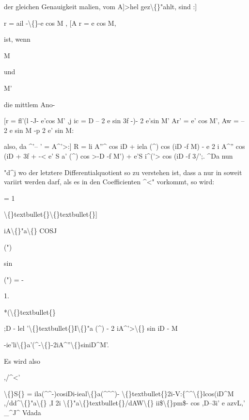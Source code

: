 \documentclass[10pt,a4paper]{article}
\begin{document}
der gleichen Genauigkeit
malien, vom A]>hel gez\textbackslash\{\}"ahlt, sind :]

r = ail -\textbackslash\{\}-e cos M ,
[A r = e cos M,

ist, wenn

M

und

M'

die mittlem Ano-

[r = fl'(l -J- e'cos M' ,j
ic = D -- 2 e sin 3f -)- 2 e'sin M'
Ar' = e' cos M',
Aw = -- 2 e sin M -p 2 e' sin M:

also, da \textasciicircum{}'-- ' = A\textasciicircum{}'>:]
R = li A''\textasciicircum{} cos iD + iela (\textasciicircum{}) cos (iD -f M) - e 2 i A\textasciicircum{}'' cos (iD + 3f
+ -< e' S a' (\textasciicircum{}) cos >-D -f M') + e'S i\textasciicircum{}('> cos (iD -f 3/';.
\textasciicircum{}Da nun

"d\textasciicircum{}j
wo der letztere Differentialquotient so zu verstehen ist, dass a nur in soweit
variirt werden darf, als es in den Coefficienten \textasciicircum{}<" vorkommt, so wird:

= 1

\textbackslash\{\}textbullet\{\}\textbackslash\{\}textbullet\{\}]

iA\textbackslash\{\}"a\textbackslash\{\} COSJ

(")

sin

(") = -

1.

*(\textbackslash\{\}textbullet\{\}

;D - lel '\textbackslash\{\}textbullet\{\}I\textbackslash\{\}"a (\textasciicircum{}) - 2 iA\textasciicircum{}'>\textbackslash\{\} sin iD - M

-ie'li\textbackslash\{\}a'(\textasciicircum{}-\textbackslash\{\}-2iA\textasciicircum{}''\textbackslash\{\}siniD\textasciicircum{}M'.

Es wird also

,/\textasciicircum{}<'

\textbackslash\{\}S\{\} = ila(\textasciicircum{}\textasciicircum{}-)cosiDi-ieal\textbackslash\{\}a(\textasciicircum{}\textasciicircum{}\textasciicircum{})- \textbackslash\{\}textbullet\{\}2i-V:\{\textasciicircum{}\textasciicircum{}\textbackslash\{\}lcos(iD\textasciicircum{}M
,/dd\textasciicircum{}\textbackslash\{\}"a\textbackslash\{\}
,I 2i
\textbackslash\{\}"a\textbackslash\{\}textbullet\{\}/dAW\textbackslash\{\}
ii\$\textbackslash\{\}pm\$- cos ,D--3i'
e azvL,' \_\textasciicircum{}J\textasciicircum{}
Vdada
\end{document}
